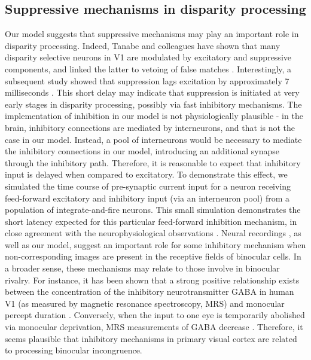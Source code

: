 \subsection{Suppressive mechanisms in disparity processing}
Our model suggests that suppressive mechanisms may play an important role in disparity processing. Indeed, Tanabe and colleagues have shown that many disparity selective neurons in V1 are modulated by excitatory and suppressive components, and linked the latter to vetoing of false matches \cite{Tanabe:2011pt}. Interestingly, a subsequent study showed that suppression lags excitation by approximately 7 milliseconds \cite{Tanabe:2014ud}. This short delay may indicate that suppression is initiated at very early stages in disparity processing, possibly via fast inhibitory mechanisms. The implementation of inhibition in our model is not physiologically plausible - in the brain, inhibitory connections are mediated by interneurons, and that is not the case in our model. Instead, a pool of interneurons would be necessary to mediate the inhibitory connections in our model, introducing an additional synapse through the inhibitory path. Therefore, it is reasonable to expect that inhibitory input is delayed when compared to excitatory. To demonstrate this effect, we simulated the time course of pre-synaptic current input for a neuron receiving feed-forward excitatory and inhibitory input (via an interneuron pool) from a population of integrate-and-fire neurons. This small simulation demonstrates the short latency expected for this particular feed-forward inhibition mechanism, in close agreement with the neurophysiological observations \cite{Tanabe:2014ud}. 
Neural recordings \cite{Tanabe:2011pt,Tanabe:2014ud}, as well as our model, suggest an important role for some inhibitory mechanism when non-corresponding images are present in the receptive fields of binocular cells. In a broader sense, these mechanisms may relate to those involve in binocular rivalry. For instance, it has been shown that a strong positive relationship exists between the concentration of the inhibitory neurotransmitter GABA in human V1 (as measured by magnetic resonance spectroscopy, MRS) and monocular percept duration \cite{Loon:2013fk}. Conversely, when the input to one eye is temporarily abolished via monocular deprivation, MRS measurements of GABA decrease \cite{Lunghi:2015lw}. Therefore, it seems plausible that inhibitory mechanisms in primary visual cortex are related to processing binocular incongruence.

